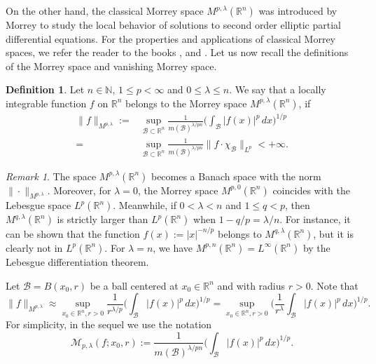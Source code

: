 \documentclass[10pt, reqno]{amsart}
\theoremstyle{definition}
\newtheorem{definition}[theorem]{Definition}
\theoremstyle{remark}
\newtheorem{remark}[theorem]{Remark}
\numberwithin{equation}{section}
\begin{document}
On the other hand, the classical Morrey space ${M}^{p,\lambda}(\mathbb R^n)$ was introduced by Morrey to study
the local behavior of solutions to second order elliptic partial differential equations. For the properties and applications of classical Morrey spaces, we refer the reader to the books \cite{adams1}, \cite{hakim1} and \cite{hakim2}. Let us now recall the definitions of the Morrey space and vanishing Morrey space.
\begin{definition}
Let $n\in \mathbb{N}$, $1\leq p<\infty$ and $0\leq\lambda\leq n$. We say that a locally integrable function $f$ on $\mathbb R^n$ belongs to the Morrey space $M^{p,\lambda}(\mathbb R^n)$, if
\begin{equation*}
\begin{split}
\big\|f\big\|_{{M}^{p,\lambda}}:=&\sup_{\mathcal{B}\subset\mathbb R^n}\frac{1}{m(\mathcal{B})^{\lambda/{pn}}}
\bigg(\int_{\mathcal{B}}|f(x)|^p\,dx\bigg)^{1/{p}}\\
=&\sup_{\mathcal{B}\subset\mathbb R^n}\frac{1}{m(\mathcal{B})^{\lambda/{pn}}}
\big\|f\cdot\chi_{\mathcal{B}}\big\|_{L^p}<+\infty.
\end{split}
\end{equation*}
\end{definition}
\begin{remark}
The space $M^{p,\lambda}(\mathbb R^n)$ becomes a Banach space with the norm $\|\cdot\|_{{M}^{p,\lambda}}$. Moreover, for $\lambda=0$, the Morrey space $M^{p,0}(\mathbb R^n)$ coincides with the Lebesgue space $L^p(\mathbb R^n)$. Meanwhile, if $0<\lambda<n$ and $1\leq q<p$, then $M^{q,\lambda}(\mathbb R^n)$ is strictly larger than $L^p(\mathbb R^n)$ when $1-q/p=\lambda/n$. For instance, it can be shown that the function $f(x):=|x|^{-n/p}$ belongs to $M^{q,\lambda}(\mathbb R^n)$, but it is clearly not in $L^p(\mathbb R^n)$. For $\lambda=n$, we have $M^{p,n}(\mathbb R^n)=L^\infty(\mathbb R^n)$ by the Lebesgue differentiation theorem.
\end{remark}
Let $\mathcal{B}=B(x_0,r)$ be a ball centered at $x_0\in \mathbb R^n$ and with radius $r>0$. Note that
\begin{equation*}
\big\|f\big\|_{{M}^{p,\lambda}}\approx\sup_{x_0\in \mathbb R^n,r>0}\frac{1}{r^{\lambda/{p}}}
\bigg(\int_{\mathcal{B}}|f(x)|^p\,dx\bigg)^{1/{p}}
=\sup_{x_0\in \mathbb R^n,r>0}\bigg(\frac{1}{r^{\lambda}}\int_{\mathcal{B}}|f(x)|^p\,dx\bigg)^{1/{p}}.
\end{equation*}
For simplicity, in the sequel we use the notation
\begin{equation*}
\mathcal{M}_{p,\lambda}(f;x_0,r):=\frac{1}{m(\mathcal{B})^{\lambda/{pn}}}
\bigg(\int_{\mathcal{B}}|f(x)|^p\,dx\bigg)^{1/p}.
\end{equation*}
\end{document}
